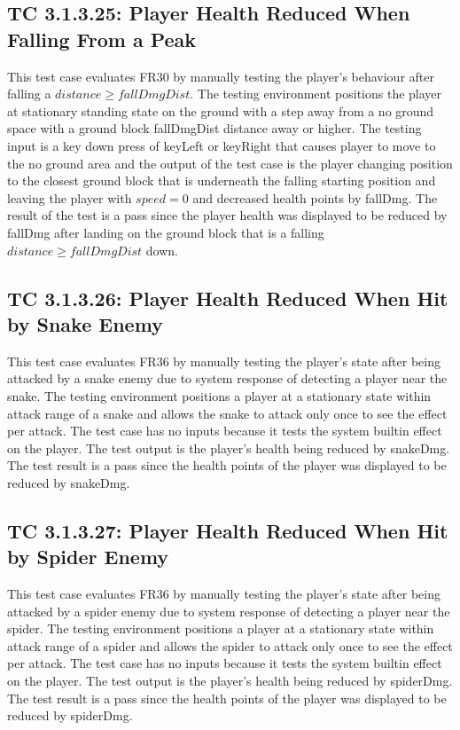\documentclass[12pt, titlepage]{article}
\begin{document}
\subsection*{TC 3.1.3.25: Player Health Reduced When Falling From a Peak}
This test case evaluates FR30 by manually testing the player's behaviour after falling a $distance \ge fallDmgDist$. The testing environment positions the player at stationary standing state on the ground with a step away from a no ground space with a ground block fallDmgDist distance away or higher. The testing input is a key down press of keyLeft or keyRight that causes player to move to the no ground area and the output of the test case is the player changing position to the closest ground block that is underneath the falling starting position and leaving the player with $speed=0$ and decreased health points by fallDmg. The result of the test is a pass since the player health was displayed to be reduced by fallDmg after landing on the ground block that is a falling $distance \ge fallDmgDist$ down. 

\subsection*{TC 3.1.3.26: Player Health Reduced When Hit by Snake Enemy}
This test case evaluates FR36 by manually testing the player's state after being attacked by a snake enemy due to system response of detecting a player near the snake. The testing environment positions a player at a stationary state within attack range of a snake and allows the snake to attack only once to see the effect per attack. The test case has no inputs because it tests the system builtin effect on the player. The test output is the player's health being reduced by snakeDmg. The test result is a pass since the health points of the player was displayed to be reduced by snakeDmg.

\subsection*{TC 3.1.3.27: Player Health Reduced When Hit by Spider Enemy}
This test case evaluates FR36 by manually testing the player's state after being attacked by a spider enemy due to system response of detecting a player near the spider. The testing environment positions a player at a stationary state within attack range of a spider and allows the spider to attack only once to see the effect per attack. The test case has no inputs because it tests the system builtin effect on the player. The test output is the player's health being reduced by spiderDmg. The test result is a pass since the health points of the player was displayed to be reduced by spiderDmg.
\end{document}
